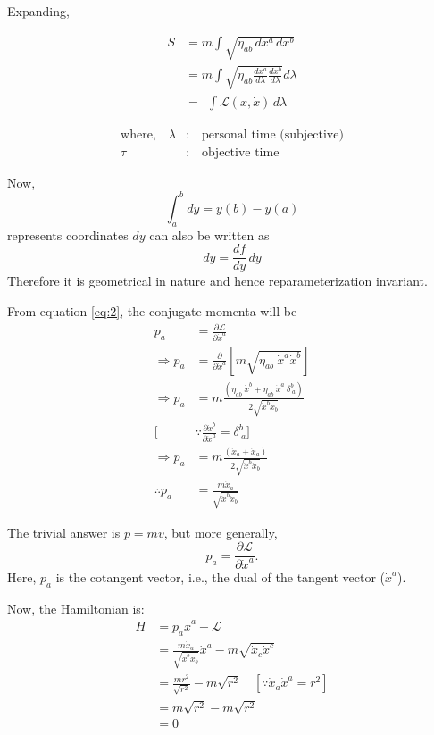 \documentclass[14pt]{article} %
\begin{document}
Expanding,\\
\begin{minipage}[c]{0.5\textwidth}
\begin{align*}
    S &= m \int \sqrt{\eta_{ab} \, dx^a \, dx^b} \\
      &= m \int \sqrt{\eta_{ab} \frac{dx^a}{d\lambda} \frac{dx^b}{d\lambda}} d\lambda \\
      &= ~~\int \mathcal{L}(x, \dot{x}) \, d\lambda \tag{2} \label{eq:2}
\end{align*}
\end{minipage}
\hfill
\begin{minipage}[c]{0.45\textwidth}
\begin{align*}
    \text{where,}\quad \lambda & : \quad \text{personal time (subjective)} \\
    \tau & : \quad \text{objective time}
\end{align*}
\end{minipage}
Now, 
\[
\int_a^b dy = y(b) - y(a)
\]
represents coordinates $dy$ can also be written as $$dy = \frac{df}{dy} \, dy$$
Therefore it is geometrical in nature and hence reparameterization invariant.

From equation \eqref{eq:2}, the conjugate momenta will be -
\begin{align*}
    p_a &= \frac{\partial \mathcal{L}}{\partial \dot{x}^a} \tag{3} \label{eq:3} \\
    \Rightarrow p_a &= \frac{\partial}{\partial \dot{x}^a} \left[ m \sqrt{\eta_{ab} ~\dot{x}^a \dot{x}^b} \right] \\
    \Rightarrow p_a &= m\frac{\left( \eta_{ab}~ \dot{x}^b + \eta_{ab}~ \dot{x}^a~ \delta^b_{~a} \right)}{2 \sqrt{\dot{x}^b \dot{x}_b}} \\
    [&\because \frac{\partial \dot{x}^b}{\partial \dot{x}^a} = \delta^b_{~a}] \\
     \Rightarrow p_a &= m\frac{\left(\dot{x}_a + \dot{x}_a\right)}{2 \sqrt{\dot{x}^b \dot{x}_b}} \\
    \therefore p_a &= \frac{m\dot{x}_a}{\sqrt{\dot{x}^b \dot{x}_b}} \tag{4} \label{eq:4}
\end{align*}
\begin{tcolorbox}[proofbox, title=\textbf{Note: How are $p$ and $v$ related?}]
The trivial answer is $p = mv$, but more generally,
\[
p_a = \frac{\partial \mathcal{L}}{\partial \dot{x}^a}.
\]
Here, $p_a$ is the cotangent vector, i.e., the dual of the tangent vector ($\dot{x}^a$).
\end{tcolorbox}
Now, the Hamiltonian is:
\begin{align*}
    H &= p_a \dot{x}^a - \mathcal{L} \\
      &= \frac{m\dot{x}_a}{\sqrt{\dot{x}^b \dot{x}_b}} \dot{x}^a - m \sqrt{\dot{x}_c \dot{x}^c} \\
      &= \frac{mr^2}{\sqrt{r^2}} - m \sqrt{r^2} \quad [\because \dot{x}_a \dot{x}^a=r^2]\\
      &= m\sqrt{r^2} - m \sqrt{r^2} \\
      &= 0
\end{align*}
\end{document}
